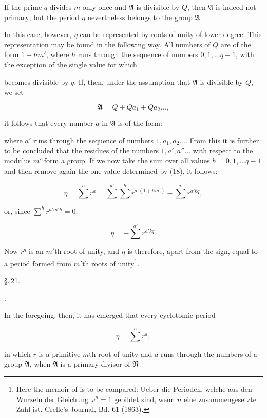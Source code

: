 
If the prime $q$ divides $m$ only once and $\mathfrak{A}$ is divisible by $Q$, then $\mathfrak{A}$ is indeed not primary; but the period $\eta$ nevertheless belongs to the group $\mathfrak{A}$.

In this case, however, $\eta$ can be represented by roots of unity of lower degree. This representation may be found in the following way. All numbers of $Q$ are of the form $1 + hm'$, where $h$ runs through the sequence of numbers $0, 1, \dots q - 1$, with the exception of the single value for which


becomes divisible by $q$. If, then, under the assumption that $\mathfrak{A}$ is divisible by $Q$, we set

\[
\mathfrak{A} = Q + Qa_1 + Qa_2 \dots,
\]

it follows that every number $a$ in $\mathfrak{A}$ is of the form:


where $a'$ runs through the sequence of numbers $1, a_1, a_2 \dots$. From this it is further to be concluded that the residues of the numbers $1, a', a'' \dots$ with respect to the modulus $m'$ form a group. If we now take the sum over all values $h = 0, 1, \dots q - 1$ and then remove again the one value determined by (18), it follows:

\[
\eta = \sum^a r^a = \sum^{a'} \sum^h r^{a'(1 + hm')} - \sum^{a'} r^{a'kq},
\]

or, since $\sum^h r^{a'm'h} = 0$:

\[
\eta = -\sum^{a'} r^{a'kq}.
\]

Now $r^q$ is an $m'$th root of unity, and $\eta$ is therefore, apart from the sign, equal to a period formed from $m'$th roots of unity\footnote{Here the memoir of  is to be compared: Ueber die Perioden, welche aus den Wurzeln der Gleichung $\omega^n = 1$ gebildet sind, wenn $n$ eine zusammengesetzte Zahl ist. Crelle's Journal, Bd. 61 (1863).}.

\begin{center}
\S.\,21.

.
\end{center}

In the foregoing, then, it has emerged that every cyclotomic period

\[
\eta = \sum^a r^a,
\]

in which $r$ is a primitive $m$th root of unity and $a$ runs through the numbers of a group $\mathfrak{A}$, when $\mathfrak{A}$ is a primary divisor of $\mathfrak{N}$
